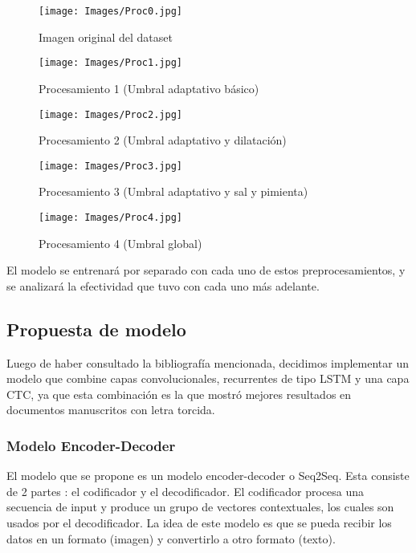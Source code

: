 \documentclass{article}
\begin{document}
\begin{figure}[!h]
    \centering
    \texttt{[image: Images/Proc0.jpg]}
    \caption{Imagen original del dataset}
    \label{fig:enter-label}
\end{figure}

\begin{figure}[!h]
    \centering
    \texttt{[image: Images/Proc1.jpg]}
    \caption{Procesamiento 1 (Umbral adaptativo básico)}
    \label{fig:enter-label}
\end{figure}

\begin{figure}[!h]
    \centering
    \texttt{[image: Images/Proc2.jpg]}
    \caption{Procesamiento 2 (Umbral adaptativo y dilatación)}
    \label{fig:enter-label}
\end{figure}

\begin{figure}[!h]
    \centering
    \texttt{[image: Images/Proc3.jpg]}
    \caption{Procesamiento 3 (Umbral adaptativo y sal y pimienta)}
    \label{fig:enter-label}
\end{figure}

\begin{figure}[!h]
    \centering
    \texttt{[image: Images/Proc4.jpg]}
    \caption{Procesamiento 4 (Umbral global)}
    \label{fig:enter-label}
\end{figure}

El modelo se entrenará por separado con cada uno de estos preprocesamientos, y se analizará la efectividad que tuvo con cada uno más adelante.

\newpage
\subsection{Propuesta de modelo}
Luego de haber consultado la bibliografía mencionada, decidimos implementar un modelo que combine capas convolucionales, recurrentes de tipo LSTM y una capa CTC, ya que esta combinación es la que mostró mejores resultados en documentos manuscritos con letra torcida.

\subsubsection{Modelo Encoder-Decoder}
El modelo que se propone es un modelo encoder-decoder\cite{18}\cite{19} o Seq2Seq. Esta consiste de 2 partes : el codificador y el decodificador. El codificador procesa una secuencia de input y produce un grupo de vectores contextuales, los cuales son usados por el decodificador. La idea de este modelo es que se pueda recibir los datos en un formato (imagen) y convertirlo a otro formato (texto).
\end{document}
